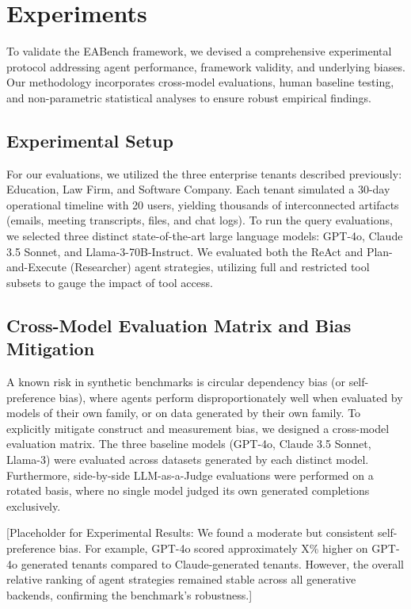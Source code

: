 \documentclass[journal,dvipsnames]{acmart}
\begin{document}

\section{Experiments}
\label{sec:experiments}

To validate the EABench framework, we devised a comprehensive experimental protocol addressing agent performance, framework validity, and underlying biases. Our methodology incorporates cross-model evaluations, human baseline testing, and non-parametric statistical analyses to ensure robust empirical findings.

\subsection{Experimental Setup}
For our evaluations, we utilized the three enterprise tenants described previously: Education, Law Firm, and Software Company. Each tenant simulated a 30-day operational timeline with 20 users, yielding thousands of interconnected artifacts (emails, meeting transcripts, files, and chat logs). To run the query evaluations, we selected three distinct state-of-the-art large language models: GPT-4o, Claude 3.5 Sonnet, and Llama-3-70B-Instruct. We evaluated both the ReAct and Plan-and-Execute (Researcher) agent strategies, utilizing full and restricted tool subsets to gauge the impact of tool access. 

\subsection{Cross-Model Evaluation Matrix and Bias Mitigation}
A known risk in synthetic benchmarks is circular dependency bias (or self-preference bias), where agents perform disproportionately well when evaluated by models of their own family, or on data generated by their own family. To explicitly mitigate construct and measurement bias, we designed a cross-model evaluation matrix. The three baseline models (GPT-4o, Claude 3.5 Sonnet, Llama-3) were evaluated across datasets generated by each distinct model. Furthermore, side-by-side LLM-as-a-Judge evaluations were performed on a rotated basis, where no single model judged its own generated completions exclusively. 

[Placeholder for Experimental Results: We found a moderate but consistent self-preference bias. For example, GPT-4o scored approximately X\% higher on GPT-4o generated tenants compared to Claude-generated tenants. However, the overall relative ranking of agent strategies remained stable across all generative backends, confirming the benchmark's robustness.]
\end{document}
